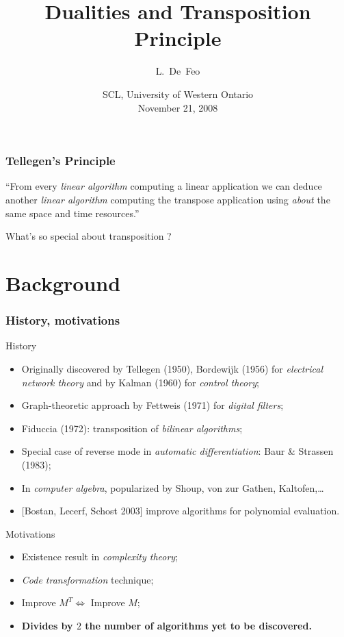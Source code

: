 \documentclass[10pt]{beamer}
\title[Dualities and Transposition Principle]{Dualities and
  Transposition Principle}
\author{L.~De~Feo}
\institute[LIX]{LIX, École Polytechnique, France}
\date[UWO, 11-21-2008]{SCL, University of Western Ontario\\November 21, 2008}
\begin{document}
\begin{frame}
  \titlepage
\end{frame}


\begin{frame}
  \frametitle{Tellegen's Principle}

  \Large
  \begin{center}
    ``From every \emph{linear algorithm} computing a
    linear application we can deduce another \emph{linear algorithm}
    computing the transpose application using \emph{about} the same
    space and time resources.''
  \end{center}

  \vfill
  \pause

  \begin{center}
    What's so special about transposition ?
  \end{center}
\end{frame}

\section{Background}

\begin{frame}
  \frametitle{History, motivations}
  
  \begin{block}{History}
    \begin{itemize}
    \item Originally discovered by \alert{Tellegen (1950)},
      \alert{Bordewijk (1956)} for \emph{electrical network theory}
      and by \alert{Kalman (1960)} for \emph{control theory};
    \item Graph-theoretic approach by \alert{Fettweis (1971)} for
      \emph{digital filters};
    \item \alert{Fiduccia (1972)}: transposition of \emph{bilinear
      algorithms};
    \item Special case of reverse mode in \emph{automatic differentiation}:
      \alert{Baur \& Strassen (1983)};
    \item In \emph{computer algebra}, popularized by \alert{Shoup},
      \alert{von zur Gathen}, \alert{Kaltofen},\dots
    \item \alert{[Bostan, Lecerf, Schost 2003]} improve algorithms for
      polynomial evaluation.
    \end{itemize}
  \end{block}
  
  \begin{block}{Motivations}
    \begin{itemize}
    \item Existence result in \emph{complexity theory};
    \item \emph{Code transformation} technique;
    \item Improve $M^T \Leftrightarrow$ Improve $M$;
    \item {\bf Divides by $2$ the number of algorithms yet to be discovered.}
    \end{itemize}
  \end{block}
\end{frame}
\end{document}
